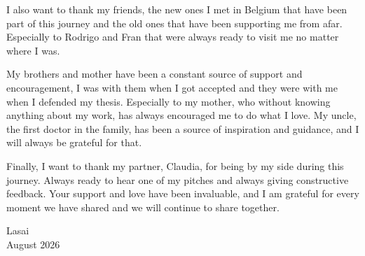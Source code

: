  I also want to thank my friends, the new ones I met in Belgium that have been part of this journey and the old ones that have been supporting me from afar. Especially to Rodrigo and Fran that were always ready to visit me no matter where I was. 

My brothers and mother have been a constant source of support and encouragement, I was with them when I got accepted and they were with me when I defended my thesis. Especially to my mother, who without knowing anything about my work, has always encouraged me to do what I love. My uncle, the first doctor in the family, has been a source of inspiration and guidance, and I will always be grateful for that. 

Finally, I want to thank my partner, Claudia, for being by my side during this journey. Always ready to hear one of my pitches and always giving constructive feedback. Your support and love have been invaluable, and I am grateful for every moment we have shared and we will continue to share together.





{\raggedleft
Lasai \\
August 2026 \\
}